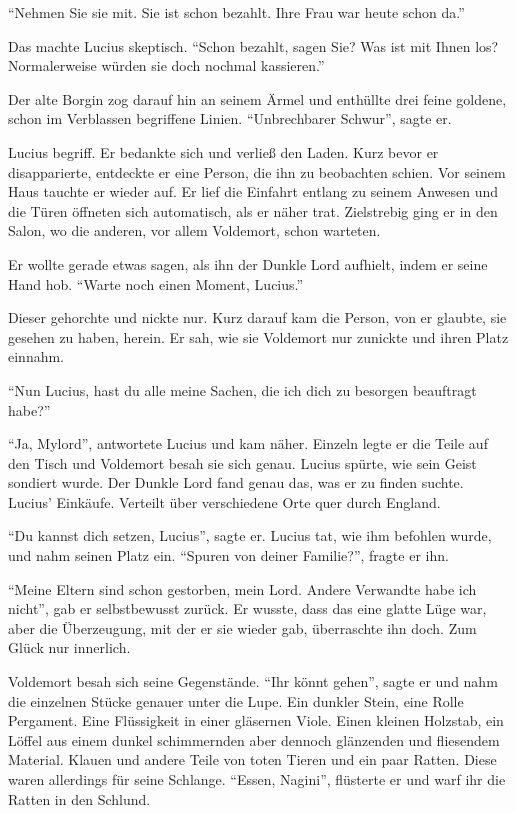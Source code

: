 \enquote{Nehmen Sie sie mit. Sie ist schon bezahlt. Ihre Frau war heute schon da.}

Das machte Lucius skeptisch. \enquote{Schon bezahlt, sagen Sie? Was ist mit Ihnen los? Normalerweise würden sie doch nochmal kassieren.}

Der alte Borgin zog darauf hin an seinem Ärmel und enthüllte drei feine goldene, schon im Verblassen begriffene Linien. \enquote{Unbrechbarer Schwur}, sagte er.

Lucius begriff. Er bedankte sich und verließ den Laden. Kurz bevor er disapparierte, entdeckte er eine Person, die ihn zu beobachten schien. Vor seinem Haus tauchte er wieder auf. Er lief die Einfahrt entlang zu seinem Anwesen und die Türen öffneten sich automatisch, als er näher trat. Zielstrebig ging er in den Salon, wo die anderen, vor allem Voldemort, schon warteten.

Er wollte gerade etwas sagen, als ihn der Dunkle Lord aufhielt, indem er seine Hand hob. \enquote{Warte noch einen Moment, Lucius.}

Dieser gehorchte und nickte nur. Kurz darauf kam die Person, von er glaubte, sie gesehen zu haben, herein. Er sah, wie sie Voldemort nur zunickte und ihren Platz einnahm.

\enquote{Nun Lucius, hast du alle meine Sachen, die ich dich zu besorgen beauftragt habe?}

\enquote{Ja, Mylord}, antwortete Lucius und kam näher. Einzeln legte er die Teile auf den Tisch und Voldemort besah sie sich genau. Lucius spürte, wie sein Geist sondiert wurde. Der Dunkle Lord fand genau das, was er zu finden suchte. Lucius’ Einkäufe. Verteilt über verschiedene Orte quer durch England.

\enquote{Du kannst dich setzen, Lucius}, sagte er. Lucius tat, wie ihm befohlen wurde, und nahm seinen Platz ein. \enquote{Spuren von deiner Familie?}, fragte er ihn.

\enquote{Meine Eltern sind schon gestorben, mein Lord. Andere Verwandte habe ich nicht}, gab er selbstbewusst zurück. Er wusste, dass das eine glatte Lüge war, aber die Überzeugung, mit der er sie wieder gab, überraschte ihn doch. Zum Glück nur innerlich.

Voldemort besah sich seine Gegenstände. \enquote{Ihr könnt gehen}, sagte er und nahm die einzelnen Stücke genauer unter die Lupe. Ein dunkler Stein, eine Rolle Pergament. Eine Flüssigkeit in einer gläsernen Viole. Einen kleinen Holzstab, ein Löffel aus einem dunkel schimmernden aber dennoch glänzenden und fliesendem Material. Klauen und andere Teile von toten Tieren und ein paar Ratten. Diese waren allerdings für seine Schlange. \enquote{Essen, Nagini}, flüsterte er und warf ihr die Ratten in den Schlund.

